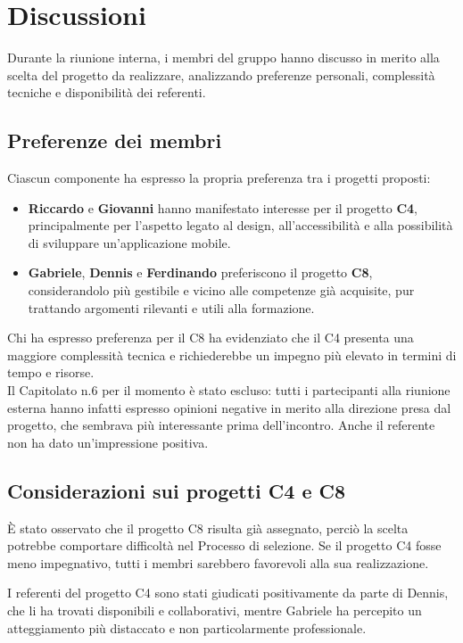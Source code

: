 \documentclass[a4paper,12pt]{article}
\begin{document}
\section{Discussioni}
Durante la riunione interna, i membri del gruppo hanno discusso in merito alla scelta del progetto da realizzare, analizzando preferenze personali, complessità tecniche e disponibilità dei referenti.

\subsection{Preferenze dei membri}
Ciascun componente ha espresso la propria preferenza tra i progetti proposti:
\begin{itemize}
    \item \textbf{Riccardo} e \textbf{Giovanni} hanno manifestato interesse per il progetto \textbf{C4}, principalmente per l’aspetto legato al design, all’accessibilità e alla possibilità di sviluppare un’applicazione mobile.
    \item \textbf{Gabriele}, \textbf{Dennis} e \textbf{Ferdinando} preferiscono il progetto \textbf{C8}, considerandolo più gestibile e vicino alle competenze già acquisite, pur trattando argomenti rilevanti e utili alla formazione.
\end{itemize}
Chi ha espresso preferenza per il C8 ha evidenziato che il C4 presenta una maggiore complessità tecnica e richiederebbe un impegno più elevato in termini di tempo e risorse.  
\\
Il Capitolato n.6 per il momento è stato escluso: tutti i partecipanti alla riunione esterna hanno infatti espresso opinioni negative in merito alla direzione presa dal progetto, che sembrava più interessante prima dell'incontro. Anche il referente non ha dato un'impressione positiva.

\subsection{Considerazioni sui progetti C4 e C8}
È stato osservato che il progetto C8 risulta già assegnato, perciò la scelta potrebbe comportare difficoltà nel Processo di selezione.  
Se il progetto C4 fosse meno impegnativo, tutti i membri sarebbero favorevoli alla sua realizzazione.  

I referenti del progetto C4 sono stati giudicati positivamente da parte di Dennis, che li ha trovati disponibili e collaborativi, mentre Gabriele ha percepito un atteggiamento più distaccato e non particolarmente professionale.
\end{document}
